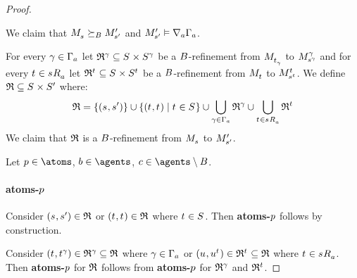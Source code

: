 \begin{proof}
\begin{figure}
\end{figure}


We claim that $\kPModel{\kStateS} \simulatesBs \kPModelP{\kStateSP}$ and $\kPModelP{\kStateSP} \entails \coversA \Gamma_\agentA$.

For every $\gamma \in \Gamma_\agentA$ let $\refinement^\gamma \subseteq \kStates \times \kStates[\gamma]$ be a $\agentsB$-refinement from $\kPModel{\kStateT_\gamma}$ to $\kPModel[\gamma]{\kStateS[\gamma]}$ and
for every $\kStateT \in \kSuccessorsA{\kStateS}$ let $\refinement^{\kStateT} \subseteq \kStates \times \kStates[\kStateT]$ be a $\agentsB$-refinement from $\kPModel{\kStateT}$ to $\kPModel[\kStateT]{\kStateS[\kStateT]}$.
We define $\refinement \subseteq \kStates \times \kStatesP$ where:
$$
\refinement = \{(\kStateS, \kStateSP)\} \cup \{(\kStateT, \kStateT) \mid \kStateT \in \kStates\} \cup \bigcup_{\gamma \in \Gamma_\agentA} \refinement^\gamma \cup \bigcup_{\kStateT \in \kSuccessorsA{\kStateS}} \refinement^{\kStateT}
$$
We claim that $\refinement$ is a $\agentsB$-refinement from $\kPModel{\kStateS}$ to $\kPModelP{\kStateSP}$.

Let $\atomP \in \atoms$, $\agentB \in \agents$, $\agentC \in \agents \setminus \agentsB$.

\paragraph{atoms-$\atomP$}
Consider $(\kStateS, \kStateSP) \in \refinement$ or $(\kStateT, \kStateT) \in \refinement$ where $\kStateT \in \kStates$.
Then {\bf atoms-$\atomP$} follows by construction.

Consider $(\kStateT, \kStateT[\gamma]) \in \refinement^\gamma \subseteq \refinement$ where $\gamma \in \Gamma_\agentA$ or $(\kStateU, \kStateU[\kStateT]) \in \refinement^{\kStateT} \subseteq \refinement$ where $\kStateT \in \kSuccessorsA{\kStateS}$.
Then {\bf atoms-$\atomP$} for $\refinement$ follows from {\bf atoms-$\atomP$} for $\refinement^\gamma$ and $\refinement^{\kStateT}$.


\end{proof}

